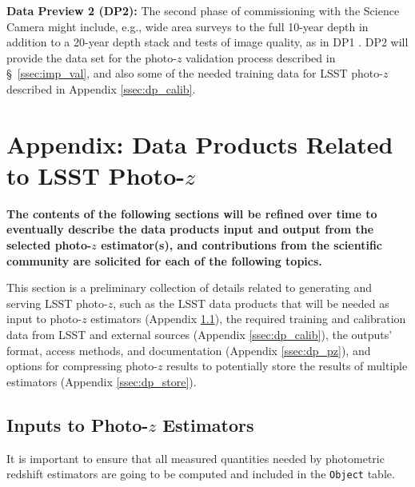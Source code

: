 \documentclass[DM,lsstdraft,toc]{lsstdoc}
\begin{document}
{\bf Data Preview 2 (DP2):} The second phase of commissioning with the Science Camera might include, e.g., wide area surveys to the full 10-year depth in addition to a 20-year depth stack and tests of image quality, as in DP1 .
DP2 will provide the data set for the photo-$z$ validation process described in \S~\ref{ssec:imp_val}, and also some of the needed training data for LSST photo-$z$ described in Appendix \ref{ssec:dp_calib}.




\clearpage



\clearpage
\appendix 

\section{Appendix: Data Products Related to LSST Photo-$z$}\label{sec:dp}

\textbf{The contents of the following sections will be refined over time to eventually describe the data products input and output from the selected photo-$z$ estimator(s), and contributions from the scientific community are solicited for each of the following topics.}

This section is a preliminary collection of details related to generating and serving LSST photo-$z$, such as the LSST data products that will be needed as input to photo-$z$ estimators (Appendix \ref{ssec:dp_objvals}), the required training and calibration data from LSST and external sources (Appendix \ref{ssec:dp_calib}), the outputs' format, access methods, and documentation (Appendix \ref{ssec:dp_pz}), and options for compressing photo-$z$ results to potentially store the results of multiple estimators (Appendix \ref{ssec:dp_store}).


\subsection{Inputs to Photo-$z$ Estimators}\label{ssec:dp_objvals}

It is important to ensure that all measured quantities needed by photometric redshift estimators are going to be computed and included in the {\tt Object} table. 
\end{document}
